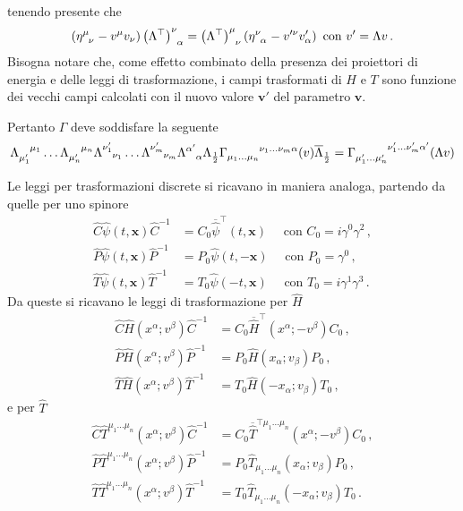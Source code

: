 \documentclass{article}
\newcommand{\adj}[1]{\overline{#1}}
\begin{document}
tenendo presente che
\begin{equation}
  \left(\eta\indices{^\mu_\nu} - v^\mu v_\nu \right) \left( \Lambda^\top \right)\indices{^\nu_\alpha} = \left( \Lambda^\top \right)\indices{^\mu_\nu} \left(\eta\indices{^\nu_\alpha} - v^{\prime \nu} v'_\alpha \right) \text{ con } v' = \Lambda v \, .
\end{equation}
Bisogna notare che, come effetto combinato della presenza dei proiettori di energia e delle leggi di trasformazione, i campi trasformati di $H$ e $T$ sono funzione dei vecchi campi calcolati con il nuovo valore $\mathbf{v}'$ del parametro $\mathbf{v}$.

Pertanto $\Gamma$ deve soddisfare la seguente
\begin{equation}
  \Lambda\indices{_{\mu'_1}^{\mu_1}} \dots \Lambda\indices{_{\mu'_n}^{\mu_n}} \Lambda\indices{^{\nu'_1}_{\nu_1}} \dots \Lambda\indices{^{\nu'_m}_{\nu_m}} \Lambda\indices{^{\alpha'}_{\alpha}}   \Lambda_{\frac{1}{2}} \Gamma\indices{_{\mu_1 \dots \mu_n}^{\nu_1 \dots \nu_m \alpha}}(v)  \adj{\Lambda}_{\frac{1}{2}}  =  \Gamma\indices{_{\mu'_1 \dots \mu'_n}^{\nu'_1 \dots \nu'_m \alpha'}}(\Lambda v)
  \label{eq:lorentz_constraint}
\end{equation} 

Le leggi per trasformazioni discrete si ricavano in maniera analoga, partendo da quelle per uno spinore \cite{book:Greiner}
\begin{align}
  \hat{C} \hat{\psi}(t, \mathbf{x}) \hat{C}^{-1} &= C_0 \adj{\hat{\psi}}^{\top}(t, \mathbf{x}) \quad \text{ con } C_0 = i \gamma^0 \gamma^2  \, ,\\
  \hat{P} \hat{\psi}(t, \mathbf{x}) \hat{P}^{-1} &= P_0 \hat{\psi}(t, -\mathbf{x}) \quad \text{ con } P_0 = \gamma^0 \, , \\
  \hat{T} \hat{\psi}(t, \mathbf{x}) \hat{T}^{-1} &= T_0 \hat{\psi}(-t, \mathbf{x}) \quad \text{ con } T_0 = i \gamma^1 \gamma^3  \, .
\end{align}
Da queste si ricavano le leggi di trasformazione per $\hat{H}$
\begin{align}
  \hat{C} \hat{H}(x^\alpha; v^\beta) \hat{C}^{-1} &= C_0 \adj{\hat{H}}^{\top}(x^\alpha; -v^\beta) C_0 \, ,\\
  \hat{P} \hat{H}(x^\alpha; v^\beta) \hat{P}^{-1} &= P_0 \hat{H}(x_\alpha; v_\beta) P_0 \, , \\
  \hat{T} \hat{H}(x^\alpha; v^\beta) \hat{T}^{-1} &= T_0 \hat{H}(-x_\alpha; v_\beta) T_0 \, ,
\end{align}
e per $\hat{T}$
\begin{align}
  \hat{C} \hat{T}^{\mu_1 \dots \mu_n}(x^\alpha; v^\beta) \hat{C}^{-1} &= C_0 \adj{\hat{T}}^{\top \mu_1 \dots \mu_n}(x^\alpha; -v^\beta) C_0 \, ,\\
  \hat{P} \hat{T}^{\mu_1 \dots \mu_n}(x^\alpha; v^\beta) \hat{P}^{-1} &= P_0 \hat{T}_{\mu_1 \dots \mu_n}(x_\alpha; v_\beta) P_0 \, , \\
  \hat{T} \hat{T}^{\mu_1 \dots \mu_n}(x^\alpha; v^\beta) \hat{T}^{-1} &= T_0 \hat{T}_{\mu_1 \dots \mu_n}(-x_\alpha; v_\beta) T_0 \, .
\end{align}
\end{document}

